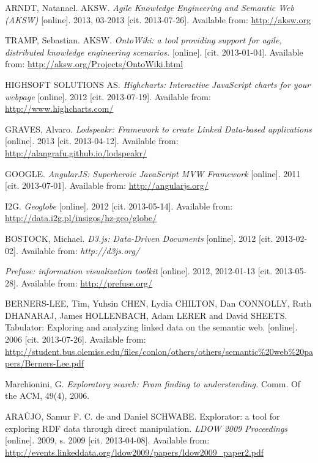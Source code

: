 \begin{thebibliography}{99}
{\sc ARNDT, Natanael.} AKSW. 
\emph{Agile Knowledge Engineering and Semantic Web (AKSW)} [online].
2013, 03-2013 [cit. 2013-07-26].
Available from: \url{http://aksw.org}

{\sc TRAMP,} Sebastian. AKSW.
\emph{OntoWiki: a tool providing support for agile, distributed knowledge engineering scenarios.}
[online]. [cit. 2013-01-04]. 
Available from: \url{http://aksw.org/Projects/OntoWiki.html}

{\sc HIGHSOFT SOLUTIONS AS.}
\emph{Highcharts: Interactive JavaScript charts for your webpage} [online]. 2012
[cit. 2013-07-19]. 
Available from: \url{http://www.highcharts.com/}

{\sc GRAVES,} Alvaro. 
\emph{Lodspeakr: Framework to create Linked Data-based applications} [online].
2013 [cit. 2013-04-12]. 
Available from: \url{http://alangrafu.github.io/lodspeakr/}

{\sc GOOGLE.}
\emph{AngularJS: Superheroic JavaScript MVW Framework} [online]. 2011
[cit. 2013-07-01]. Available from: \url{http://angularjs.org/}

{\sc I2G.}
\emph{Geoglobe} [online]. 2012 [cit. 2013-05-14].
Available from: \url{http://data.i2g.pl/insigos/hz-geo/globe/}

{\sc BOSTOCK}, Michael. 
\emph{D3.js: Data-Driven Documents} [online]. 2012 [cit. 2013-02-02].
Available from: \emph{http://d3js.org/}

\emph{Prefuse: information visualization toolkit} [online]. 2012, 2012-01-13 [cit. 2013-05-28].
Available from: \url{http://prefuse.org/}

{\sc BERNERS-LEE,} Tim, Yuhsin CHEN, Lydia CHILTON, Dan CONNOLLY,
Ruth DHANARAJ, James HOLLENBACH, Adam LERER and David SHEETS.
Tabulator: Exploring and analyzing linked data on the semantic web.
 [online]. 2006 [cit. 2013-07-26]. 
Available from: \url{http://student.bus.olemiss.edu/files/conlon/others/others/semantic%20web%20papers/Berners-Lee.pdf}

{\sc Marchionini,} G. \emph{Exploratory search: From finding to 
understanding.} Comm. Of the ACM, 49(4), 2006.

{\sc ARAÚJO,} Samur F. C. de and Daniel SCHWABE.
Explorator: a tool for exploring RDF data through direct  manipulation. 
\emph{LDOW 2009 Proceedings} [online]. 2009, s. 2009 [cit. 2013-04-08].
Available from: \url{http://events.linkeddata.org/ldow2009/papers/ldow2009_paper2.pdf}


\end{thebibliography}

